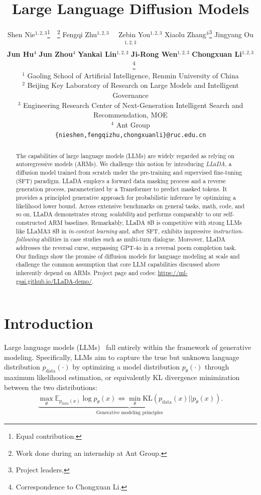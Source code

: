 \documentclass{article}
\title{Large Language Diffusion Models}
\author{%
  Shen Nie$^{1,2,3}$\thanks{Equal contribution.}~~\thanks{Work done during an internship at Ant Group.} \quad
  Fengqi Zhu$^{1,2,3}$\samethanks[1]~~\samethanks[2] \quad
  Zebin You$^{1,2,3}$\samethanks[2] \quad
  Xiaolu Zhang$^{4}$\thanks{Project leaders.} \quad
  Jingyang Ou$^{1,2,3}$ \\
  \textbf{Jun Hu}$^{4}$\samethanks[3] \quad
  \textbf{Jun Zhou}$^{4}$ \quad
  \textbf{Yankai Lin}$^{1,2,3}$\samethanks[3] \quad
  \textbf{Ji-Rong Wen}$^{1,2,3}$ \quad
  \textbf{Chongxuan Li}$^{1,2,3}$\samethanks[3]~~\thanks{Correspondence to Chongxuan Li.} \\
  $^1$ Gaoling School of Artificial Intelligence, Renmin University of China \\
  $^2$ Beijing Key Laboratory of Research on Large Models and Intelligent Governance \\
  $^3$ Engineering Research Center of Next-Generation Intelligent Search and Recommendation, MOE \\
  $^4$ Ant Group\\
  \texttt{\{nieshen,fengqizhu,chongxuanli\}@ruc.edu.cn} 
}
\begin{document}
\maketitle

\begin{abstract}
  The capabilities of large language models (LLMs) are widely regarded as relying on autoregressive models (ARMs). We challenge this notion by introducing \emph{LLaDA}, a diffusion model trained from scratch under the pre-training and supervised fine-tuning (SFT) paradigm. LLaDA employs a forward data masking process and a reverse generation process, parameterized by a Transformer to predict masked tokens. It provides a principled generative approach for probabilistic inference by optimizing a likelihood lower bound. Across extensive benchmarks on general tasks, math, code, and so on, LLaDA demonstrates strong \emph{scalability} and performs comparably to our self-constructed ARM baselines. Remarkably, LLaDA 8B is competitive with strong LLMs like LLaMA3 8B in \emph{in-context learning} and, after SFT, exhibits impressive \emph{instruction-following} abilities in case studies such as multi-turn dialogue. Moreover, LLaDA addresses the reversal curse, surpassing GPT-4o in a reversal poem completion task. Our findings show the promise of diffusion models for language modeling at scale and challenge the common assumption that core LLM capabilities discussed above inherently depend on ARMs. Project page and codes: \url{https://ml-gsai.github.io/LLaDA-demo/}.
\end{abstract}

\section{Introduction}
\label{sec:introduction}


Large language models (LLMs)~\citep{zhao2023survey} fall entirely within the framework of generative modeling. Specifically, LLMs aim to capture the true but unknown language distribution \( p_{\textrm{data}}(\cdot) \) by optimizing a model distribution \( p_{\theta}(\cdot) \) through maximum likelihood estimation, or equivalently KL divergence minimization between the two distributions:
\begin{align}
\label{eq:llm}
 \underbrace{\max_{\theta} \mathbb{E}_{ p_{\textrm{data}}(x) }\log p_{\theta}(x) \Leftrightarrow \min_{\theta} \textrm{KL}(p_{\textrm{data}}(x) || p_{\theta}(x))}_{\textrm{Generative modeling principles}}.
\end{align}
\end{document}
